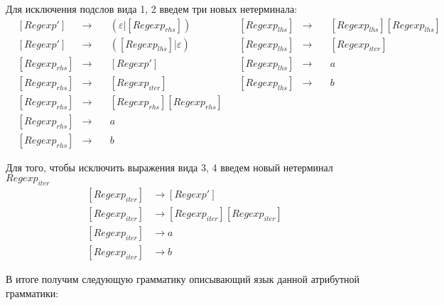 \documentclass[a4paper, 14pt]{article}
\begin{document}
Для исключения подслов вида 1, 2 введем три новых нетерминала:
$$
\begin{aligned}
  &[Regexp'] &\rightarrow \quad &{(\varepsilon|[Regexp_{rhs}])} & &[Regexp_{lhs}] &\rightarrow \quad &{[Regexp_{lhs}][Regexp_{lhs}]} \\
  &[Regexp'] &\rightarrow \quad &{([Regexp_{lhs}]|\varepsilon)} & &[Regexp_{lhs}] &\rightarrow \quad  &{[Regexp_{iter}]} \\
  &[Regexp_{rhs}] &\rightarrow \quad &{[Regexp']} & &[Regexp_{lhs}] &\rightarrow \quad  &a\\ 
  &[Regexp_{rhs}] &\rightarrow \quad &{[Regexp_{iter}]} & &[Regexp_{lhs}] &\rightarrow \quad  &b\\ 
  &[Regexp_{rhs}] &\rightarrow \quad &{[Regexp_{rhs}][Regexp_{rhs}]} \\
  &[Regexp_{rhs}] &\rightarrow \quad &a \\
  &[Regexp_{rhs}] &\rightarrow \quad &b
\end{aligned}
$$


Для того, чтобы исключить выражения вида 3, 4 введем новый нетерминал $Regexp_{iter}$
$$
\begin{aligned}
  [Regexp_{iter}] &\rightarrow [Regexp'] \\
  [Regexp_{iter}] &\rightarrow [Regexp_{iter}][Regexp_{iter}] \\
  [Regexp_{iter}] &\rightarrow a \\
  [Regexp_{iter}] &\rightarrow b
\end{aligned}
$$


В итоге получим следующую грамматику описывающий язык данной атрибутной грамматики: 
\end{document}
